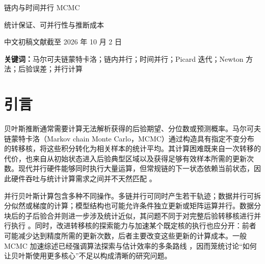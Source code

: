 \documentclass[UTF8,a4paper,zihao=-4,fontset=fandol]{ctexart}
\begin{document}
\begin{center}
{\heiti 链内与时间并行 MCMC\par}
\vspace{5pt}
{\heiti 统计保证、可并行性与推断成本\par}
\vspace{9pt}
{\small 中文初稿\quad 文献截至 2026 年 10 月 2 日\par}
\end{center}
\vspace{5pt}

\begin{abstract}
马尔可夫链蒙特卡洛的顺序依赖限制了单链对并行硬件的利用，但增加处理器数量并不必然缩短达到后验精度要求的时间。预取、多提议更新和近期发展的时间并行方法，分别通过提前计算可能路径、改变转移核以及并行求解轨迹方程分配计算，其统计保证与成本不能直接互换。本文围绕链内与时间并行 MCMC，对截至 2026 年 10 月 2 日的代表性成果进行专题综述，区分固定随机输入下的轨迹等价、目标分布不变性和有限时间误差控制，并从总工作量、执行深度、内存及完整推断流程解释加速结果。现有证据表明，减少顺序轮数的收益受后验几何、数值求解迭代、并行宽度和硬件开销共同制约；谱隙、梯度调用次数或重建质量的改善也不能直接替代后验估计精度的验证。本文据此梳理 Picard、Newton 及近似 Newton 方法与现代多链调参和诊断的关系，提出面向共同误差目标的比较原则，并讨论提前停止误差控制、有限资源分配和动态采样器等开放问题。该组织方式旨在为算法选择与后续基准研究提供可核查的依据。

\end{abstract}
{\noindent\textbf{关键词：}马尔可夫链蒙特卡洛；链内并行；时间并行；Picard 迭代；Newton 方法；后验误差；并行计算\par}

\section{引言}

贝叶斯推断通常需要计算无法解析获得的后验期望、分位数或预测概率。马尔可夫链蒙特卡洛（Markov chain Monte Carlo，MCMC）通过构造具有指定不变分布的转移核，将这些积分转化为相关样本的统计平均。其计算困难既来自一次转移的代价，也来自从初始状态进入后验典型区域以及获得足够有效样本所需的更新次数。现代并行硬件能够同时执行大量运算，但常规链的下一状态依赖当前状态，因此硬件吞吐与统计计算需求之间并不天然匹配 \cite{angelino2016,sountsov2026}。

并行贝叶斯计算包含多种不同操作。多链并行可同时产生若干轨迹；数据并行可拆分似然或梯度的计算；模型结构也可能允许条件独立更新或矩阵运算并行。数据分块后的子后验合并则进一步涉及统计近似，其问题不同于对完整后验转移核进行并行执行 \cite{bardenet2017}。同时，改进转移核的探索能力与加速某个既定核的执行也应分开：前者可能减少达到精度所需的更新次数，后者主要改变这些更新的计算成本。一般 MCMC 加速综述已经强调算法探索与估计效率的多条路线 \cite{robert2018}，因而笼统讨论“如何让贝叶斯使用更多核心”不足以构成清晰的研究问题。
\end{document}
